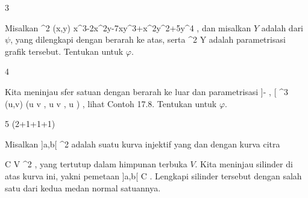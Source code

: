 
{3}
{

Misalkan
\maabbeledisp {\psi} {\R^2} {\R
} {(x,y)} { x^3-2x^2y-7xy^3+x^2y^2+5y^4
} {,}
dan misalkan $Y$ adalah
dari $\psi$, yang dilengkapi dengan
berarah ke atas, serta
 {\R^2} {Y
} {}
adalah parametrisasi grafik tersebut. Tentukan
untuk $\varphi$.

}
{} {}

{4}
{

Kita meninjau sfer satuan dengan
berarah ke luar dan parametrisasi
\maabbeledisp {\varphi} {{]{- {  }},  {  } [} \times {]{-\pi}, \pi[} } {\R^3
} {(u,v)} {(\cos  u  \cos  v  , \cos  u  \sin  v  , \sin  u )
} {,}
lihat
Contoh 17.8.
Tentukan
untuk $\varphi$.

}
{} {}

{5 (2+1+1+1)}
{

Misalkan
\maabb {\gamma} {]a,b[} { \R^2
} {}
adalah suatu kurva injektif yang
dan
dengan kurva citra

\mavergleichskettedisp
{\vergleichskette
{ C
}
{ \subseteq} { V
}
{ \subseteq} { \R^2
}
{ } {
}
{ } {
}
}
{}{}{,}
yang tertutup dalam himpunan terbuka $V$. Kita meninjau silinder di atas kurva ini, yakni pemetaan
 {]a,b[ \times \R } { C \times \R
} {.}
Lengkapi silinder tersebut dengan salah satu dari kedua medan normal satuannya.

}
{} {}
